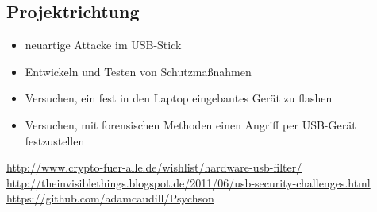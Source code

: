 \documentclass[
a4paper, %
twoside%
]{article}
\begin{document}
\subsection{Projektrichtung}
\begin{itemize}
\item neuartige Attacke im USB-Stick
\item Entwickeln und Testen von Schutzmaßnahmen
\item Versuchen, ein fest in den Laptop eingebautes Gerät zu flashen
\item Versuchen, mit forensischen Methoden einen Angriff per USB-Gerät
  festzustellen
\end{itemize}
\url{http://www.crypto-fuer-alle.de/wishlist/hardware-usb-filter/}
\url{http://theinvisiblethings.blogspot.de/2011/06/usb-security-challenges.html}
\url{https://github.com/adamcaudill/Psychson}
\end{document}
